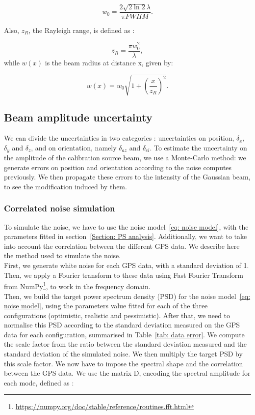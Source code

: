 \documentclass[../../thesis.tex]{subfiles}
\begin{document}
\begin{equation}
    w_0 = \frac{2 \sqrt{2 \ln2} \lambda}{\pi FWHM}.
\end{equation}

Also, $z_R$, the Rayleigh range, is defined as :

\begin{equation}
    z_R = \frac{\pi w_0^2}{\lambda},
\end{equation}
while $w(x)$ is the beam radius at distance x, given by:

\begin{equation}
    w(x) = w_0 \sqrt{1 + (\frac{x}{z_R})^2}.
\end{equation}

\subsection{Beam amplitude uncertainty}
We can divide the uncertainties in two categories : uncertainties on position, $\delta_x$, $\delta_y$ and $\delta_z$, and on orientation, namely $\delta_{az}$ and $\delta_{el}$. To estimate the uncertainty on the amplitude of the calibration source beam, we use a Monte-Carlo method: we generate errors on position and orientation according to the noise computes previously. We then propagate these errors to the intensity of the Gaussian beam, to see the modification induced by them.

\subsubsection{Correlated noise simulation}
To simulate the noise, we have to use the noise model~\ref{eq: noise model}, with the parameters fitted in section~\ref{Section: PS analysis}. Additionally, we want to take into account the correlation between the different GPS data. We describe here the method used to simulate the noise. \\
First, we generate white noise for each GPS data, with a standard deviation of 1. Then, we apply a Fourier transform to these data using Fast Fourier Transform from NumPy\footnote{\url{https://numpy.org/doc/stable/reference/routines.fft.html}}, to work in the frequency domain. \\
Then, we build the target power spectrum density (PSD) for the noise model~\ref{eq: noise model}, using the parameters value fitted for each of the three configurations (optimistic, realistic and pessimistic). After that, we need to normalise this PSD according to the standard deviation measured on the GPS data for each configuration, summarised in Table~\ref{tab: data error}. We compute the scale factor from the ratio between the standard deviation measured and the standard deviation of the simulated noise. We then multiply the target PSD by this scale factor.
We now have to impose the spectral shape and the correlation between the GPS data. We use the matrix D, encoding the spectral amplitude for each mode, defined as :
\end{document}
